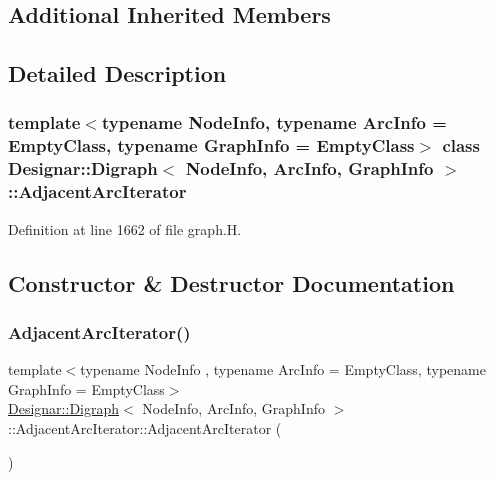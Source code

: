 \subsection*{Additional Inherited Members}


\subsection{Detailed Description}
\subsubsection*{template$<$typename Node\+Info, typename Arc\+Info = Empty\+Class, typename Graph\+Info = Empty\+Class$>$\newline
class Designar\+::\+Digraph$<$ Node\+Info, Arc\+Info, Graph\+Info $>$\+::\+Adjacent\+Arc\+Iterator}



Definition at line 1662 of file graph.\+H.



\subsection{Constructor \& Destructor Documentation}
\mbox{\label{class_designar_1_1_digraph_1_1_adjacent_arc_iterator_a44c04d22e04c7458517a41bced9338f6}} 
\subsubsection{\texorpdfstring{Adjacent\+Arc\+Iterator()}{AdjacentArcIterator()}\hspace{0.1cm}{\footnotesize\ttfamily [1/5]}}
{\footnotesize\ttfamily template$<$typename Node\+Info , typename Arc\+Info  = Empty\+Class, typename Graph\+Info  = Empty\+Class$>$ \\
\hyperlink{class_designar_1_1_digraph}{Designar\+::\+Digraph}$<$ Node\+Info, Arc\+Info, Graph\+Info $>$\+::Adjacent\+Arc\+Iterator\+::\+Adjacent\+Arc\+Iterator (\begin{DoxyParamCaption}{ }\end{DoxyParamCaption})\hspace{0.3cm}{\ttfamily [inline]}}



